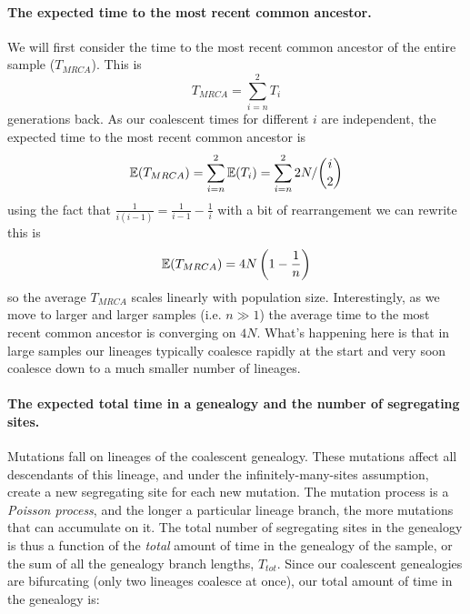 \paragraph{The expected time to the most recent common ancestor.}
We will first consider the time to the most recent common ancestor of
the entire sample ($T_{MRCA}$). This is
\begin{equation}
T_{MRCA} = \sum_{i=n}^2 T_i
\end{equation}
generations back. As our coalescent times for different $i$ are independent, the expected time to the most recent common ancestor
is
\begin{equation}
\mathbb{E}(T_{MRCA}) = \sum_{i=n}^2 \mathbb{E}(T_i) = \sum_{i=n}^2  2N/{i \choose
 2}
\end{equation}
using the fact that $\frac{1}{i(i-1)}=\frac{1}{i-1} - \frac{1}{i}$ with a bit of
rearrangement we can rewrite this is
\begin{equation} 
\mathbb{E}(T_{MRCA}) = 4N\left(1- \frac{1}{n} \right) \label{TMRCA_neutral}
\end{equation}
so the average $T_{MRCA}$ scales linearly with population
size. Interestingly, as we move to larger and larger samples (i.e. $n \gg 1$) the average
time to the most recent common ancestor is converging on $4N$. What's
happening here is that in large samples our lineages typically coalesce rapidly
at the start and very soon coalesce down to a much smaller number of
lineages.   \\


\paragraph{The expected total time in a genealogy and the number of
  segregating sites.}

Mutations fall on lineages of the coalescent genealogy. These mutations affect all
descendants of this lineage, and under the infinitely-many-sites assumption,
create a new segregating site for each new mutation. The mutation process is a
\emph{Poisson process}, and the longer a particular lineage branch, the more
mutations that can accumulate on it. The total number of segregating sites in
the genealogy is thus a function of the \emph{total} amount of time in the
genealogy of the sample, or the sum of all the genealogy branch lengths,
$T_{tot}$. Since our coalescent genealogies are bifurcating (only two lineages
coalesce at once), our total amount of time in the genealogy is:

